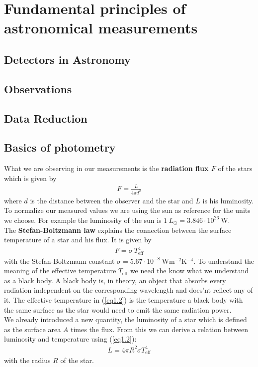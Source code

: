 \chapter{Fundamental principles of astronomical measurements}
\section{Detectors in Astronomy}

\section{Observations}

\section{Data Reduction}

\section{Basics of photometry}
What we are observing in our measurements is the \textbf{radiation flux $F$} of the stars which is given by
\begin{align}
	F = \frac{L}{4\pi d^2}
\end{align}
where $d$ is the distance between the observer and the star and $L$ is his luminosity. \\
To normalize our measured values we are using the sun as reference for the units we choose. For example the luminosity of the sun is 
	$1 \ L_{\odot} = 3.846 \cdot 10^{26} \ \si{\watt}$. \\	
The \textbf{Stefan-Boltzmann law} explains the connection between the surface temperature of a star and his flux. It is given by
\begin{align}
	F = \sigma \ T_{\text{eff}}^4\label{eq1.2}
\end{align}
with the Stefan-Boltzmann constant $\sigma = 5.67 \cdot 10^{-8} \ \si{\watt\meter^{-2}\kelvin^{-4}}$. To understand the meaning of the effective temperature $T_{\text{eff}}$ we need the know what we understand as a black body. A black body is, in theory, an object that absorbs every radiation independent on the corresponding wavelength and does'nt reflect any of it. The effective temperature in (\ref{eq1.2}) is the temperature a black body with the same surface as the star would need to emit the same radiation power. \\
We already introduced a new quantity, the luminosity of a star which is defined as the surface area $A$ times the flux. From this we can derive a relation between luminosity and temperature using (\ref{eq1.2}):
\begin{align}
	L = 4\pi R^2\sigma T_{\text{eff}}^4
\end{align}
with the radius $R$ of the star.

